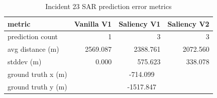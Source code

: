 \begin{table}[ht]
\centering
\caption{Incident 23 SAR prediction error metrics}
\label{tab:sar-incident-23}
\begin{tabular}{lrrr}
\hline
metric & Vanilla V1 & Saliency V1 & Saliency V2 \\
\hline
prediction count & 1 & 3 & 3 \\
avg distance (m) & 2569.087 & 2388.761 & 2072.560 \\
stddev (m) & 0.000 & 575.623 & 338.078 \\
ground truth x (m) & \multicolumn{3}{c}{-714.099} \\
ground truth y (m) & \multicolumn{3}{c}{-1517.847} \\
\hline
\end{tabular}
\end{table}
